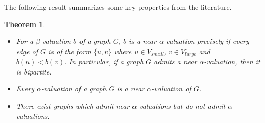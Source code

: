 \documentclass[12pt, a4paper]{article}
\newtheorem{theorem}{Theorem}[section]
\theoremstyle{definition}
\begin{document}
The following result summarizes some key properties from the literature. 
\begin{theorem}\label{thm:nearprops}
\begin{itemize}
\item[(i)] For a $\beta$-valuation $b$ of a graph $G$, $b$ is a near $\alpha$-valuation precisely if every edge of $G$ is of the form $\{u,v\}$ where $u \in V_{small}$, $v \in V_{large}$ and $b(u)<b(v)$. In particular, if a graph $G$ admits a near $\alpha$-valuation, then it is bipartite.
\item[(ii)] Every $\alpha$-valuation of a graph $G$ is a near $\alpha$-valuation of $G$.
\item[(iii)] There exist graphs which admit near $\alpha$-valuations but do not admit $\alpha$-valuations.
\end{itemize}
\end{theorem}
\end{document}
